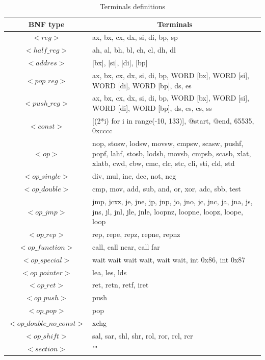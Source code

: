 \documentclass[dvipsnames,format=sigconf,anonymous=true,review=true]{acmart}
\begin{document}
\begin{table}
\centering
\begin{tabular}{|c|p{11.6cm}|} 
\hline
\multicolumn{1}{|c|}{\textbf{BNF type}} &
\multicolumn{1}{c|}{\textbf{Terminals}} \\ [0.5ex] \hline\hline
$<reg>$ & ax, bx, cx, dx, si, di, bp, sp \\ \hline
$<half\_reg>$ & ah, al, bh, bl, ch, cl, dh, dl \\ \hline
$<addres>$ & [bx], [si], [di], [bp] \\ \hline
$<pop\_reg>$ & ax, bx, cx, dx, si, di, bp, WORD [bx], WORD [si],  WORD [di],  WORD [bp], ds, es \\ \hline
$<push\_reg>$ &  ax, bx, cx, dx, si, di, bp, WORD [bx], WORD [si],  WORD [di],  WORD [bp], ds, es, cs, ss \\ \hline
$<const>$ & [(2*i) for i in range(-10, 133)], @start, @end, 65535, 0xcccc \\ \hline
$<op>$ & nop, stosw, lodsw, movsw, cmpsw, scasw, pushf, popf, lahf, stosb, lodsb, movsb, cmpsb, scasb, xlat, xlatb, cwd, cbw, cmc, clc, stc, cli, sti, cld, std\\ \hline
$<op\_single>$ & div, mul, inc, dec, not, neg \\ \hline
$<op\_double>$ & cmp, mov, add, sub, and, or, xor, adc, sbb, test \\
\hline
$<op\_jmp>$ & jmp, jcxz, je, jne, jp, jnp, jo, jno, jc, jnc, ja, jna, js, jns, jl, jnl, jle, jnle, loopnz, loopne, loopz, loope, loop \\ \hline
$<op\_rep>$ & rep, repe, repz, repne, repnz \\ \hline
$<op\_function>$ & call, call near, call far \\ \hline
$<op\_special>$ & wait wait wait wait, wait wait, int 0x86, int 0x87  \\ \hline
$<op\_pointer>$ & lea, les, lds\\ \hline
$<op\_ret>$ & ret, retn, retf, iret\\ \hline
$<op\_push>$ & push\\ \hline
$<op\_pop>$ & pop\\ \hline
$<op\_double\_no\_const>$ & xchg\\ \hline
$<op\_shift>$ & sal, sar, shl, shr, rol, ror, rcl, rcr\\ \hline
$<section>$ & "" \\ \hline

\end{tabular}
\caption{Terminals definitions}
\label{table:1_terniaml_set}
\end{table}
\end{document}
